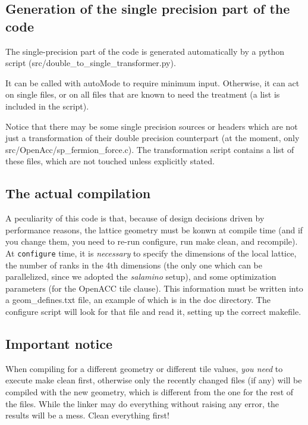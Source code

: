 \subsection{Generation of the single precision part of the code}
The single-precision part of the code is generated automatically 
by a python script ({\sf src/double\_to\_single\_transformer.py}).

It can be called with {\sf autoMode} to require minimum input. Otherwise, it can act on
single files, or on all files that are known to need the treatment (a list is included in the script).

Notice that there may be some single precision sources or headers which are not just a 
transformation of their double precision counterpart (at the moment, only 
{\sf src/OpenAcc/sp\_fermion\_force.c}). The transformation script contains a list
of these files, which are not touched unless explicitly stated.


\subsection{The actual compilation}

A peculiarity of this code is that, because of design decisions driven by 
performance reasons, the lattice geometry must be konwn at compile time (and 
if you change them, you need to re-run {\sf configure}, run {\sf make clean}, and recompile). 
At \verb|configure| time, it is \emph{necessary} to  specify the dimensions of the local lattice,
the number of ranks in the 4th dimensions (the only one which can be 
parallelized, since we adopted the \emph{salamino} setup), and some optimization parameters
(for the OpenACC  {\sf tile} clause). This information must be written into a 
{\sf geom\_defines.txt} file, an example of which is in the {\sf doc} directory.
The {\sf configure} script will look for that file and read it, setting up the correct makefile.

\subsection{Important notice}

When compiling for a different geometry or different {\sf tile values}, \emph{you need} to execute 
{\sf make clean} first, otherwise only the recently changed files  (if 
any) will be 
compiled with the new geometry, which is different from the one for the rest of 
the files. While the linker may do everything without raising any error, the results will be a 
mess. Clean everything first!\\

